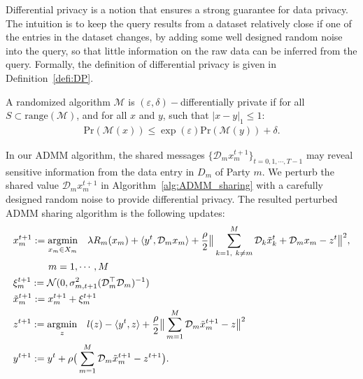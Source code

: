 Differential privacy \cite{dwork2014algorithmic, zhou2010security} is a notion that ensures a strong guarantee for data privacy. The intuition is to keep the query results from a dataset relatively close if one of the entries in the dataset changes, by adding some well designed random noise into the query, so that little information on the raw data can be inferred from the query. Formally, the definition of differential privacy is given in Definition~\ref{defi:DP}.
\begin{defi}\label{defi:DP}
A randomized algorithm $\mathcal{M}$ is $(\varepsilon, \delta)-$differentially private if for all $S\subset\text{range}(\mathcal{M})$, and for all $x$ and $y$, such that $|x-y|_1\le 1$:
\begin{align}
\text{Pr}(\mathcal{M}(x))\le \exp(\varepsilon)\text{Pr}(\mathcal{M}(y))+\delta.
\end{align}
\end{defi}
In our ADMM algorithm, the shared messages $\{\mathcal{D}_mx_m^{t+1}\}_{t=0,1,\cdots,T-1}$ may reveal sensitive information from the data entry in $D_m$ of Party $m$. We perturb the shared value $\mathcal{D}_mx^{t+1}_m$ in Algorithm~\ref{alg:ADMM_sharing} with a carefully designed random noise to provide differential privacy. The resulted perturbed ADMM sharing algorithm is the following updates:
\begin{align}
  &x_{m}^{t+1}:=\underset{x_m\in X_m}{\text{argmin}}\quad\lambda R_m(x_m) + \langle y^t, \mathcal{D}_mx_m\rangle + \frac{\rho}{2}\big\|\sum_{\substack{k=1,~k\neq m}}^{M}\mathcal{D}_k\tilde{x}_k^{t} + \mathcal{D}_mx_m - z^t\big\|^2, \nonumber\\&\hspace*{36pt} m=1,\cdots,M
  \nonumber\\
  &\xi_m^{t+1}:=\mathcal{N}(0,\sigma_{m,t+1}^2
  (\mathcal{D}_m^\top\mathcal{D}_m)^{-1}
  )\nonumber\\
  &\tilde{x}_m^{t+1}:= x_m^{t+1}+\xi_m^{t+1}\label{admmstepsdp}\\
  &z^{t+1}:=\underset{z}{\text{argmin}}\quad l(z)  - \langle y^t, z \rangle + \frac{\rho}{2} \big\|\sum_{m=1}^{M}\mathcal{D}_m\tilde{x}_m^{t+1} - z\big\|^2\nonumber\\
&y^{t+1}:=y^t + \rho\big(\sum_{m=1}^{M}\mathcal{D}_m\tilde{x}_m^{t+1} - z^{t+1}\big). \nonumber
\end{align}
